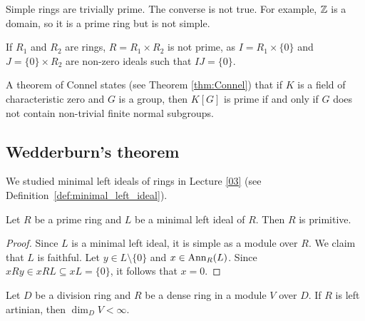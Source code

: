 Simple rings are trivially prime. The converse is not true. For example,
$\mathbb{Z}$ is a domain, so it is a prime ring but is not simple.

\begin{example}
	If $R_1$ and $R_2$ are rings, $R=R_1\times R_2$ is not prime, as 
	$I=R_1\times\{0\}$ and $J=\{0\}\times R_2$ are non-zero ideals such that $IJ=\{0\}$.
\end{example}

A theorem of Connel states (see Theorem \ref{thm:Connel}) that 
if $K$ is a field of characteristic zero and $G$ 
is a group, then $K[G]$ is prime if and only if 
$G$ does not contain non-trivial finite normal subgroups. 



\subsection{Wedderburn's theorem}

We studied minimal left ideals of rings in Lecture \ref{03} (see Definition~\ref{def:minimal_left_ideal}).  

\begin{lemma}
	\label{lem:primoizqmin=>prim}
	Let $R$ be a prime ring and $L$ be a minimal left ideal of $R$.
	Then $R$ is primitive. 
\end{lemma}

\begin{proof}
	Since $L$ is a minimal left ideal, it is simple as a module over $R$. 
	We claim that $L$ is faithful. Let $y\in L\setminus\{0\}$ and
	$x\in\operatorname{Ann}_R(L)$. Since $xRy\in xRL\subseteq xL=\{0\}$, it follows that 
	$x=0$.
\end{proof}

\begin{lemma}
	\label{lem:denso_artiniano}
	Let $D$ be a division ring and $R$ be a dense ring in a module $V$ over $D$. 
	If $R$ is left artinian, then $\dim_DV<\infty$.
\end{lemma}

